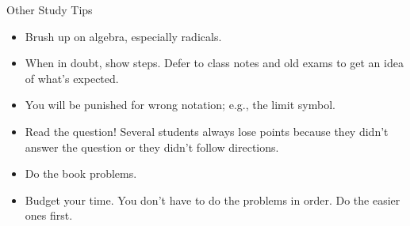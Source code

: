 \documentclass[cal1spr16Lectures.tex]{subfiles}
\begin{document}
\begin{frame}{\small Other Study Tips}\footnotesize
\begin{itemize}
\item Brush up on algebra, especially radicals.
\item When in doubt, show steps.  Defer to class notes and old exams to get an idea of what's expected.
\item You will be punished for wrong notation; e.g., the limit symbol.
\item Read the question!  Several students always lose points because they didn't answer the question or they didn't follow directions.
\item Do the book problems.
\item Budget your time.  You don't have to do the problems in order.  Do the easier ones first.
\end{itemize}
\end{frame}
\end{document}
